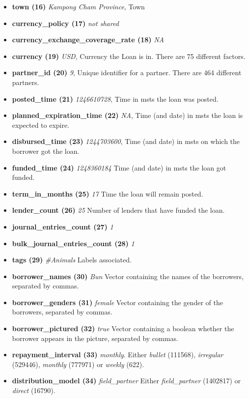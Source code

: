 \begin{itemize}
\item \textbf{town (16)} \textit{Kampong Cham Province}, Town
\item \textbf{currency\_policy (17)} \textit{not shared}
\item \textbf{currency\_exchange\_coverage\_rate (18)} \textit{NA}
\item \textbf{currency (19)} \textit{USD}, Currency the Loan is in. There are 75 different factors.
\item \textbf{partner\_id (20)} \textit{9}, Unique identifier for a partner. There are 464 different partners.
\item \textbf{posted\_time (21)} \textit{1246610728}, Time in msts the loan was posted.
\item \textbf{planned\_expiration\_time (22)} \textit{NA}, Time (and date)  in msts the loan is expected to expire.
\item \textbf{disbursed\_time (23)} \textit{1244703600}, Time (and date) in msts on which the borrower got the loan.
\item \textbf{funded\_time (24)} \textit{1248360184} Time (and date) in msts the loan got funded.
\item \textbf{term\_in\_months (25)} \textit{17} Time the loan will remain posted.
\item \textbf{lender\_count (26)} \textit{25} Number of lenders that have funded the loan.
\item \textbf{journal\_entries\_count (27)} \textit{1}
\item \textbf{bulk\_journal\_entries\_count (28)} \textit{1}
\item \textbf{tags (29)} \textit{\#Animals} Labels associated.
\item \textbf{borrower\_names (30)} \textit{Bun} Vector containing the names of the borrowers, separated by commas.
\item \textbf{borrower\_genders (31)} \textit{female} Vector containing the gender of the borrowers, separated by commas.
\item \textbf{borrower\_pictured (32)} \textit{true} Vector containing a boolean whether the borrower appears in the picture, separated by commas.
\item \textbf{repayment\_interval (33)} \textit{monthly}. Either \textit{bullet} (111568), \textit{irregular} (529446), \textit{monthly} (777971) or \textit{weekly} (622).
\item \textbf{distribution\_model (34)} \textit{field\_partner} Either \textit{field\_partner} (1402817) or \textit{direct} (16790).
\end{itemize}


